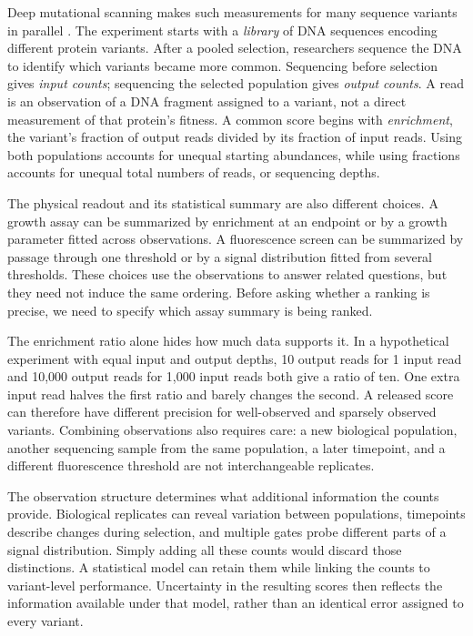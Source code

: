\documentclass[11pt]{article}
\begin{document}
Deep mutational scanning makes such measurements for many sequence variants
in parallel \citep{fowler2014}. The experiment starts with a \emph{library}
of DNA sequences encoding different protein variants. After a pooled
selection, researchers sequence the DNA to identify which variants became
more common. Sequencing before selection gives \emph{input counts};
sequencing the selected population gives \emph{output counts}. A read is
an observation of a DNA fragment assigned to a variant, not a direct
measurement of that protein's fitness. A common score begins with
\emph{enrichment}, the variant's fraction of output reads divided by its
fraction of input reads. Using both populations accounts for unequal
starting abundances, while using fractions accounts for unequal total
numbers of reads, or sequencing depths.

The physical readout and its statistical summary are also different
choices. A growth assay can be summarized by enrichment at an endpoint
or by a growth parameter fitted across observations. A fluorescence
screen can be summarized by passage through one threshold or by a
signal distribution fitted from several thresholds. These choices use
the observations to answer related questions, but they need not induce
the same ordering. Before asking whether a ranking is precise, we need
to specify which assay summary is being ranked.

The enrichment ratio alone hides how much data supports it. In a
hypothetical experiment with equal input and output depths, 10 output reads
for 1 input read and 10,000 output reads for 1,000 input reads both give
a ratio of ten. One extra input read halves the first ratio and barely
changes the second. A released score can therefore have different precision
for well-observed and sparsely observed variants. Combining observations
also requires care: a new biological population, another sequencing sample
from the same population, a later timepoint, and a different fluorescence
threshold are not interchangeable replicates.

The observation structure determines what additional information the
counts provide. Biological replicates can reveal variation between
populations, timepoints describe changes during selection, and multiple
gates probe different parts of a signal distribution. Simply adding all
these counts would discard those distinctions. A statistical model can
retain them while linking the counts to variant-level performance.
Uncertainty in the resulting scores then reflects the information
available under that model, rather than an identical error assigned to
every variant.
\end{document}
